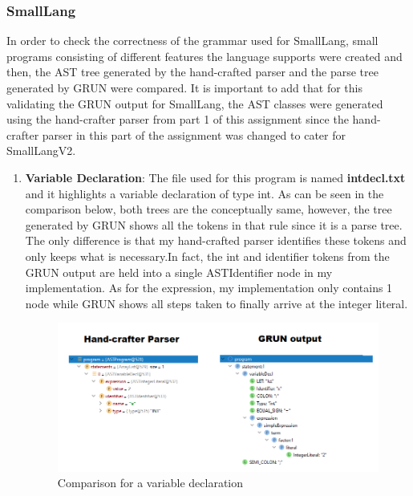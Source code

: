 \documentclass{article}
\begin{document}
		\subsubsection{SmallLang}
		
		In order to check the correctness of the grammar used for SmallLang, small programs consisting of different features the language supports were created and then, the AST tree generated by the hand-crafted parser and the parse tree generated by GRUN were compared. It is important to add that for this validating the GRUN output for SmallLang, the AST classes were generated using the hand-crafter parser from part 1 of this assignment since the hand-crafter parser in this part of the assignment was changed to cater for SmallLangV2.
		
		\begin{enumerate}
		\item \textbf{Variable Declaration}: The file used for this program is named \textbf{intdecl.txt} and it highlights a variable declaration of type int. As can be seen in the comparison below, both trees are the conceptually same, however, the tree generated by GRUN shows all the tokens in that rule since it is a parse tree. The only difference is that my hand-crafted parser identifies these tokens and only keeps what is necessary.In fact, the int and identifier tokens from the GRUN output are held into a single ASTIdentifier node in my implementation. As for the expression, my implementation only contains 1 node while GRUN shows all steps taken to finally arrive at the integer literal.
						\begin{figure}[H]
					\centering
			 			\includegraphics[width=\textwidth]{comparedecl.png}
			  			\caption{Comparison for a variable declaration}
			  			\label{fig:comparedecl}
					\end{figure}
					

\end{enumerate}
\end{document}
